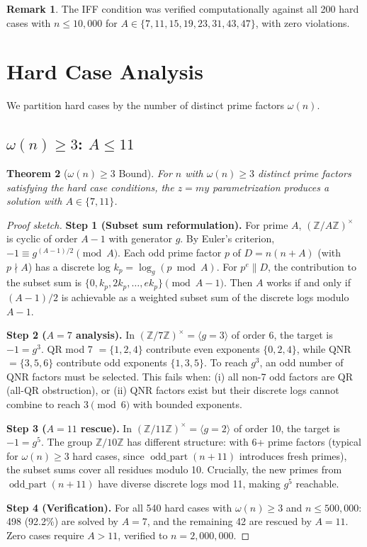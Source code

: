 \documentclass[11pt,a4paper]{article}
\theoremstyle{plain}
\newtheorem{theorem}{Theorem}[section]
\theoremstyle{plain}
\theoremstyle{definition}
\newtheorem{remark}[theorem]{Remark}
\numberwithin{equation}{section}
\begin{document}
\begin{remark}
The IFF condition was verified computationally against all 200 hard cases with $n \leq 10{,}000$ for $A \in \{7, 11, 15, 19, 23, 31, 43, 47\}$, with zero violations.
\end{remark}

\section{Hard Case Analysis}

We partition hard cases by the number of distinct prime factors $\omega(n)$.

\subsection{\texorpdfstring{$\omega(n) \geq 3$}{omega(n) >= 3}: \texorpdfstring{$A \leq 11$}{A <= 11}}

\begin{theorem}[$\omega(n) \geq 3$ Bound]\label{thm:omega3}
For $n$ with $\omega(n) \geq 3$ distinct prime factors satisfying the hard case conditions, the $z = my$ parametrization produces a solution with $A \in \{7, 11\}$.
\end{theorem}

\begin{proof}[Proof sketch]
\textbf{Step 1 (Subset sum reformulation).} For prime $A$, $(\mathbb{Z}/A\mathbb{Z})^\times$ is cyclic of order $A - 1$ with generator $g$. By Euler's criterion, $-1 \equiv g^{(A-1)/2} \pmod{A}$. Each odd prime factor $p$ of $D = n(n+A)$ (with $p \nmid A$) has a discrete log $k_p = \log_g(p \bmod A)$. For $p^e \| D$, the contribution to the subset sum is $\{0, k_p, 2k_p, \ldots, ek_p\} \pmod{A-1}$. Then $A$ works if and only if $(A-1)/2$ is achievable as a weighted subset sum of the discrete logs modulo $A - 1$.

\textbf{Step 2 ($A = 7$ analysis).} In $(\mathbb{Z}/7\mathbb{Z})^\times = \langle g = 3 \rangle$ of order 6, the target is $-1 = g^3$. QR mod 7 $= \{1, 2, 4\}$ contribute even exponents $\{0, 2, 4\}$, while QNR $= \{3, 5, 6\}$ contribute odd exponents $\{1, 3, 5\}$. To reach $g^3$, an odd number of QNR factors must be selected. This fails when: (i) all non-7 odd factors are QR (all-QR obstruction), or (ii) QNR factors exist but their discrete logs cannot combine to reach $3 \pmod{6}$ with bounded exponents.

\textbf{Step 3 ($A = 11$ rescue).} In $(\mathbb{Z}/11\mathbb{Z})^\times = \langle g = 2 \rangle$ of order 10, the target is $-1 = g^5$. The group $\mathbb{Z}/10\mathbb{Z}$ has different structure: with 6+ prime factors (typical for $\omega(n) \geq 3$ hard cases, since $\operatorname{odd\_part}(n+11)$ introduces fresh primes), the subset sums cover all residues modulo 10. Crucially, the new primes from $\operatorname{odd\_part}(n+11)$ have diverse discrete logs mod 11, making $g^5$ reachable.

\textbf{Step 4 (Verification).} For all 540 hard cases with $\omega(n) \geq 3$ and $n \leq 500{,}000$: 498 (92.2\%) are solved by $A = 7$, and the remaining 42 are rescued by $A = 11$. Zero cases require $A > 11$, verified to $n = 2{,}000{,}000$.
\end{proof}
\end{document}
